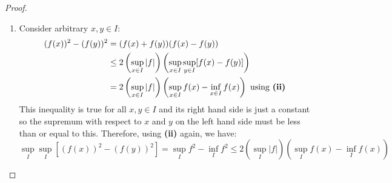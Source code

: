 \documentclass[../main.tex]{subfiles}
\begin{document}
\begin{proof}
\begin{enumerate}
\begin{proofcases}
\begin{case}{$f \geq 0$ or $f \leq 0$ on all of $I$}
          If $f \leq 0$ on all of $I$, then $|f| = -f$ so by \textbf{(ii)}:
          \[
            \sup_{I} |f| - \inf_{I} |f| = \sup_{I} (-f) - \inf_{I} (-f) = - \inf_{I} f + \sup_{I} f
          \]
          So we again have equality.
        \end{case}
        \begin{case}{$\inf_I f < 0 < \sup_I f$}
          We then have that:
          \[
            \sup_{x \in I} |f| - \inf_{I} |f| \leq \sup_{x \in I} |f| = \max\left\{\sup_{I} f, \sup_{I} (-f)\right\} \\
          \]
          By \textbf{ii}, $\sup_{I} (-f) = - \inf_{x \in I} f > 0$.
          We also know that $\sup_{I} f > 0$ and so:
          \[
            \sup_{I} |f| - \inf_{I} |f| = \max\left\{\sup_{I} f, -\inf_{I} f\right\} \leq \sup_{I} f - \inf_{I} f
          \]
          as the maximum of two positive numbers is less than their sum.
        \end{case}
      \end{proofcases}
    \item Consider arbitrary $x, y \in I$:
      \begin{align*}
        (f(x))^2 - (f(y))^2 &= (f(x) + f(y))(f(x) - f(y)) \\
                            &\leq 2 \left(\sup_{x \in I} |f|\right)\left(\sup_{x \in I}\sup_{y \in I}[f(x) - f(y)]\right) \\
                            &= 2 \left(\sup_{x \in I} |f|\right)\left(\sup_{x \in I}f(x) - \inf_{x \in I} f(x)\right) \text{ using \textbf{(ii)}}
      \end{align*}
      This inequality is true for all $x, y \in I$ and its right hand side is just a constant so the supremum with respect to $x$ and $y$ on the left hand side must be less than or equal to this.
      Therefore, using \textbf{(ii)} again, we have:
      \[
        \sup_{I} \sup_{I}[(f(x))^2 - (f(y))^2] = \sup_{I} f^2 - \inf_{I} f^2 \leq 2 \left(\sup_{I} |f|\right)\left(\sup_{I}f(x) - \inf_{I} f(x)\right)
      \]
  \end{enumerate}
\end{proof}
\end{document}
